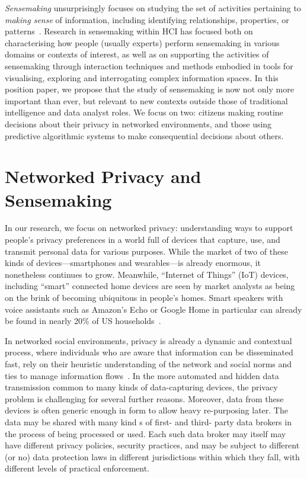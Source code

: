 \documentclass[sigchi-a, authorversion]{acmart}
\begin{document}
\emph{Sensemaking} unsurprisingly focuses on studying the set of activities pertaining to \emph{making sense} of information, including identifying relationships, properties, or patterns~\cite{pirolli2005sensemaking}.  Research in sensemaking within HCI has focused both on characterising how people (usually experts) perform sensemaking in various domains or contexts of interest, as well as on supporting the activities of sensemaking through interaction techniques and methods embodied in tools for visualising, exploring and interrogating complex information spaces.  In this position paper, we propose that the study of sensemaking is now not only more important than ever, but relevant to new contexts outside those of traditional intelligence and data analyst roles. We focus on two: citizens making routine decisions about their privacy in networked environments, and those using predictive algorithmic systems to make consequential decisions about others.


\section{Networked Privacy and Sensemaking}

In our research, we focus on networked privacy: understanding ways to support people's privacy preferences in a world full of devices that capture, use, and transmit personal data for various purposes.
While the market of two of these kinds of devices---smartphones and wearables---is already enormous, it nonetheless continues to grow.  Meanwhile, ``Internet of Things'' (IoT) devices, including ``smart'' connected home devices are seen by market analysts as being on the brink of becoming ubiquitous in people's homes.  Smart speakers with voice assistants such as Amazon's Echo or Google Home in particular can already be found in nearly 20\% of US households~\cite{smartspeaker}. 

In networked social environments, privacy is already a dynamic and contextual process, where individuals who are aware that information can be disseminated fast, rely on their heuristic understanding of the network and social norms and ties to manage information flows~\cite{marwick2014networked}. In the more automated and hidden data transmission common to many kinds of data-capturing devices, the privacy problem is challenging for several further reasons.  Moreover, data from these devices is often generic enough in form to allow heavy re-purposing later.  The data may be shared with many kind s of first- and third- party data brokers in the process of being processed or used.  Each such data broker may itself may have different privacy policies, security practices, and may be subject to different (or no) data protection laws in different jurisdictions within which they fall, with different levels of practical enforcement.  
\end{document}
